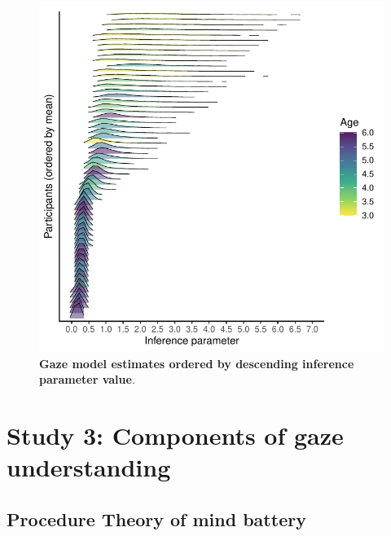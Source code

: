 \documentclass[
  man,floatsintext]{apa7}
\begin{document}
\begin{figure}[H]

{\centering \includegraphics[width=1\linewidth]{../figures/supplements_gazemodel_indinference} 

}

\caption{\textbf{Gaze model estimates ordered by descending inference parameter value}.}\label{fig:fig4}
\end{figure}

\newpage

\hypertarget{study-3-components-of-gaze-understanding}{%
\section{Study 3: Components of gaze understanding}\label{study-3-components-of-gaze-understanding}}

\hypertarget{procedure-theory-of-mind-battery}{%
\subsection{Procedure Theory of mind battery}\label{procedure-theory-of-mind-battery}}
\end{document}

